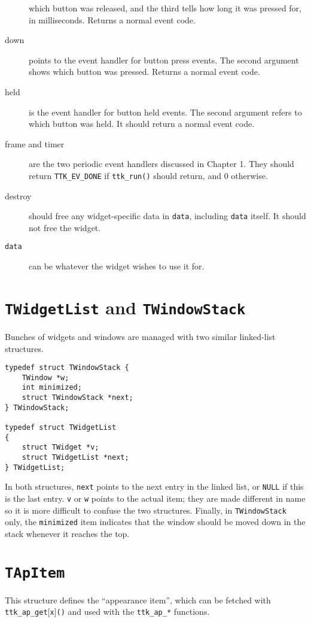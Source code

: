 \documentclass[12pt,letterpaper]{report}
\let\ttt\tt
\def\tt{\def\_{{\ttt\char`\_}}\ttt}
\def\texttt#1{{\tt #1}}
\begin{document}
\begin{description}
which button was released, and the third tells how long it was pressed for, in milliseconds.
Returns a normal event code.
\item[{\sf down}] points to the event handler for button press events. The second argument shows which
button was pressed. Returns a normal event code.
\item[{\sf held}] is the event handler for button held events. The second argument refers to which button
was held. It should return a normal event code.
\item[{\sf frame} and {\sf timer}] are the two periodic event handlers discussed in Chapter 1. They
should return \verb|TTK_EV_DONE| if \verb|ttk_run()| should return, and 0 otherwise.
\item[{\sf destroy}] should free any widget-specific data in {\tt data}, including {\tt data} itself.
It should not free the widget.
\item[{\tt data}] can be whatever the widget wishes to use it for.
\end{description}

\section{\texttt{TWidgetList} and \texttt{TWindowStack}}
Bunches of widgets and windows are managed with two similar linked-list structures.
\begin{verbatim}
typedef struct TWindowStack {
    TWindow *w;
    int minimized;
    struct TWindowStack *next;
} TWindowStack;

typedef struct TWidgetList 
{
    struct TWidget *v;
    struct TWidgetList *next;
} TWidgetList;
\end{verbatim}

In both structures, \verb|next| points to the next entry in the linked list, or \verb|NULL| if this is
the last entry. \texttt{v} or \texttt{w} points to the actual item; they are made different in name
so it is more difficult to confuse the two structures. Finally, in \verb|TWindowStack| only,
the \verb|minimized| item indicates that the window should be moved down in the stack whenever it
reaches the top.

\section{\texttt{TApItem}}
This structure defines the ``appearance item'', which can be fetched with \verb|ttk_ap_get|[\verb|x|]\verb|()|
and used with the \verb|ttk_ap_*| functions.
\end{document}
